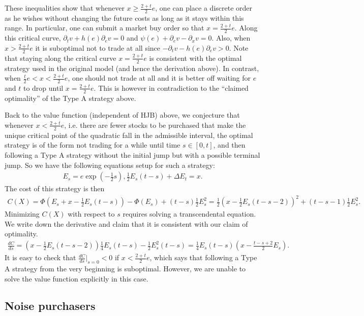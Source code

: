 \documentclass[openany,oneside]{article}
\theoremstyle{definition}
\theoremstyle{remark}
\begin{document}
{These inequalities show that whenever $x\ge \frac{2+t}{2}e$, one can place a discrete order as he wishes without changing the future costs as long as it stays within this range. In particular, one can submit a market buy order so that $x=\frac{2+t}{2}e$. Along this critical curve, $\partial_t v + h(e)\partial_e v =0$ and $\psi(e)+\partial_e v -\partial_x v=0$. Also, when $x>\frac{2+t}{2}e$ it is suboptimal not to trade at all since $-\partial_t v -h(e)\partial_e v >0$. Note that staying along the critical curve $x=\frac{2+t}{2}e$ is consistent with the optimal strategy used in the original model (and hence the derivation above). In contrast, when $\frac{t}{2}e<x<\frac{2+t}{2}e$, one should not trade at all and it is better off waiting for $e$ and $t$ to drop until $x=\frac{2+t}{2}e$. This is however in contradiction to the ``claimed optimality'' of the Type A strategy above.

Back to the value function (independent of HJB) above, we conjecture that whenever $x<\frac{2+t}{2}e$, i.e. there are fewer stocks to be purchased that make the unique critical point of the quadratic fall in the admissible interval, the optimal strategy is of the form not trading for a while until time $s\in[0,t]$, and then following a Type A strategy without the initial jump but with a possible terminal jump. So we have the following equations setup for such a strategy:
\begin{align*}
E_s = e\exp\left(-\frac{1}{2}s\right), \frac{1}{2}E_s(t-s) + \Delta E_t = x.
\end{align*}
The cost of this strategy is then
\begin{align*}
C(X) = \Phi\left(E_s+x-\frac{1}{2}E_s(t-s)\right) - \Phi(E_s) + (t-s)\frac{1}{2}E^2_s = \frac{1}{2}\left(x-\frac{1}{2}E_s(t-s-2)\right)^2 + (t-s-1)\frac{1}{2}E^2_s.
\end{align*}
Minimizing $C(X)$ with respect to $s$ requires solving a transcendental equation. We write down the derivative and claim that it is consistent with our claim of optimality.
\begin{align*}
\frac{dC}{ds} = \left(x-\frac{1}{2}E_s(t-s-2)\right)\frac{1}{4}E_s(t-s) - \frac{1}{2}E^2_s(t-s) = \frac{1}{4}E_s (t-s) \left(x-\frac{t-s+2}{2}E_s\right).
\end{align*}
It is easy to check that $\frac{dC}{ds}\big|_{s=0} < 0$ if $x<\frac{2+t}{2}e$, which says that following a Type A strategy from the very beginning is suboptimal. However, we are unable to solve the value function explicitly in this case.


\subsection{Noise purchasers}
}




{}

\end{document}
